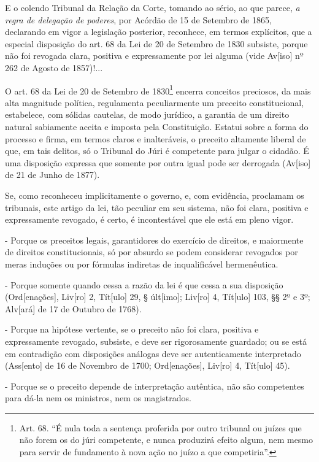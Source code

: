 E o colendo Tribunal da Relação da Corte, tomando ao sério, ao que
parece, \emph{a regra de delegação de poderes}, por Acórdão de 15 de
Setembro de 1865, declarando em vigor a legislação posterior, reconhece,
em termos explícitos, que a especial disposição do art. 68 da Lei de 20
de Setembro de 1830 subsiste, porque não foi revogada clara, positiva e
expressamente por lei alguma (vide Av{[}iso{]} nº 262 de Agosto de
1857)!...

O art. 68 da Lei de 20 de Setembro de 1830\footnote{Art. 68. ``É nula
  toda a sentença proferida por outro tribunal ou juízes que não forem
  os do júri competente, e nunca produzirá efeito algum, nem mesmo para
  servir de fundamento à nova ação no juízo a que competiria''.} encerra
conceitos preciosos, da mais alta magnitude política, regulamenta
peculiarmente um preceito constitucional, estabelece, com sólidas
cautelas, de modo jurídico, a garantia de um direito natural sabiamente
aceita e imposta pela Constituição. Estatui sobre a forma do processo e
firma, em termos claros e inalteráveis, o preceito altamente liberal de
que, em tais delitos, só o Tribunal do Júri é competente para julgar o
cidadão. É uma disposição expressa que somente por outra igual pode ser
derrogada (Av{[}iso{]} de 21 de Junho de 1877).

Se, como reconheceu implicitamente o governo, e, com evidência,
proclamam os tribunais, este artigo da lei, tão peculiar em seu sistema,
não foi clara, positiva e expressamente revogado, é certo, é
incontestável que ele está em pleno vigor.

- Porque os preceitos legais, garantidores do exercício de direitos, e
maiormente de direitos constitucionais, só por absurdo se podem
considerar revogados por meras induções ou por fórmulas indiretas de
inqualificável hermenêutica.

- Porque somente quando cessa a razão da lei é que cessa a sua
disposição (Ord{[}enações{]}, Liv{[}ro{]} 2, Tít{[}ulo{]} 29, §
últ{[}imo{]}; Liv{[}ro{]} 4, Tít{[}ulo{]} 103, §§ 2º e 3º; Alv{[}ará{]}
de 17 de Outubro de 1768).

- Porque na hipótese vertente, se o preceito não foi clara, positiva e
expressamente revogado, subsiste, e deve ser rigorosamente guardado; ou
se está em contradição com disposições análogas deve ser autenticamente
interpretado (Ass{[}ento{]} de 16 de Novembro de 1700; Ord{[}enações{]},
Liv{[}ro{]} 4, Tít{[}ulo{]} 45).

- Porque se o preceito depende de interpretação autêntica, não são
competentes para dá-la nem os ministros, nem os magistrados.

